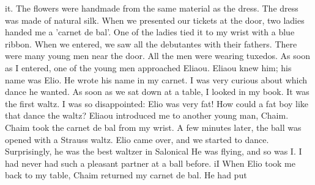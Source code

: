 it.
The flowers were handmade from the same material as the dress.
The dress was made 
of natural silk.
When we presented our tickets at the door, two ladies handed me a 
'carnet de bal'.
One of the ladies tied it to my wrist with a blue ribbon.
When we 
entered, we saw all the debutantes with their fathers.
There were many young men near 
the door.
All the men were wearing tuxedos.
As soon as I entered, one of the young men approached Eliaou.
Eliaou knew him; 
his name was Elio.
He wrote his name in my carnet.
I was very curious about which 
dance he wanted.
As soon as we sat down at a table, I looked in my book.
It was the 
first waltz.
I was so disappointed: Elio was very fat!
How could a fat boy like that 
dance the waltz?
Eliaou introduced me to another young man, Chaim.
Chaim took the carnet de bal 
from my wrist.
A few minutes later, the ball was opened with a Strauss waltz.
Elio 
came over, and we started to dance.
Surprisingly, he was the best waltzer in Salonical 
He was flying, and so was I. I had never had such a pleasant partner at a ball before.
iI 
When Elio took me back to my table, Chaim returned my carnet de bal.
He had put